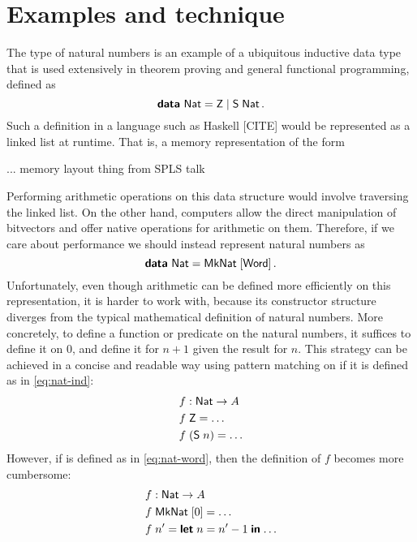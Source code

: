\section{Examples and technique}\label{sec:technique}

The type of natural numbers is an example of a ubiquitous inductive data type
that is used extensively in theorem proving and general functional programming,
defined as
\begin{equation}\label{eq:nat-ind}
  \textsf{\textbf{data}}\ \textsf{Nat} = \textsf{Z} \mid \textsf{S}\;\textsf{Nat} \,.
\end{equation}
Such a definition in a language such as Haskell [CITE] would be represented as
a linked list at runtime. That is, a memory representation of the form

... memory layout thing from SPLS talk

Performing arithmetic operations on this data structure would involve
traversing the linked list. On the other hand, computers allow the direct
manipulation of bitvectors and offer native operations for arithmetic on them.
Therefore, if we care about performance we should instead represent natural
numbers as
\begin{equation}\label{eq:nat-word}
  \textsf{\textbf{data}}\ \textsf{Nat} = \textsf{MkNat} \; [\textsf{Word}] \,.
\end{equation}
Unfortunately, even though arithmetic can be defined more efficiently on this
representation, it is harder to work with, because its constructor structure
diverges from the typical mathematical definition of natural numbers. More
concretely, to define a function or predicate on the natural numbers, it
suffices to define it on 0, and define it for $n + 1$ given the result for $n$.
This strategy can be achieved in a concise and readable way using pattern
matching on  if it is defined as in \eqref{eq:nat-ind}:
\begin{align*}
   & f : \textsf{Nat} \to A        \\
   & f\; \textsf{Z} = \ldots       \\
   & f\; (\textsf{S}\; n) = \ldots
\end{align*}
However, if  is defined as in \eqref{eq:nat-word}, then the
definition of $f$ becomes more cumbersome:
\begin{align*}
   & f : \textsf{Nat} \to A              \\
   & f\; \textsf{MkNat} \; [0] = \ldots  \\
   & f\; n' = \textsf{\textbf{let}}\; {n} = {n' - 1}\; \textsf{\textbf{in}}\; {\ldots}
\end{align*}

